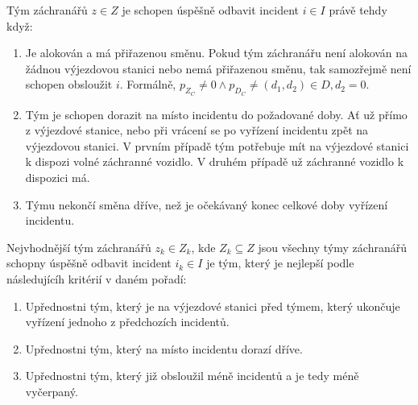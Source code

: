 \begin{definice}
  Tým záchranářů $z \in Z$ je schopen úspěšně odbavit incident $i \in I$ právě tehdy když:

  \begin{enumerate}
    \item
      Je alokován a má přiřazenou směnu. Pokud tým záchranářu není alokován na žádnou výjezdovou stanici nebo nemá přiřazenou směnu, tak samozřejmě není schopen obsloužit $i$.
      Formálně, $p_{Z_C} \neq 0 \land p_{D_C} \neq (d_1, d_2) \in D, d_2 = 0$.

    \item
      Tým je schopen dorazit na místo incidentu do požadované doby.
      Ať už přímo z výjezdové stanice, nebo při vrácení se po vyřízení incidentu zpět na výjezdovou stanici. 
      V prvním případě tým potřebuje mít na výjezdové stanici k dispozi volné záchranné vozidlo. V druhém případě už záchranné vozidlo k dispozici má.

    \item
      Týmu nekončí směna dříve, než je očekávaný konec celkové doby vyřízení incidentu.
  \end{enumerate}
\end{definice}


\begin{definice}
  Nejvhodnější tým záchranářů $z_k \in Z_k$, kde $Z_k \subseteq Z$ jsou všechny týmy záchranářů schopny úspěšně odbavit incident $i_k \in I$ je tým,
  který je nejlepší podle následujícíh kritérií v daném pořadí:

  \begin{enumerate}
    \item Upřednostni tým, který je na výjezdové stanici před týmem, který ukončuje vyřízení jednoho z předchozích incidentů. 
    \item Upřednostni tým, který na místo incidentu dorazí dříve. 
    \item Upřednostni tým, který již obsloužil méně incidentů a je tedy méně vyčerpaný.
  \end{enumerate}
\end{definice}

